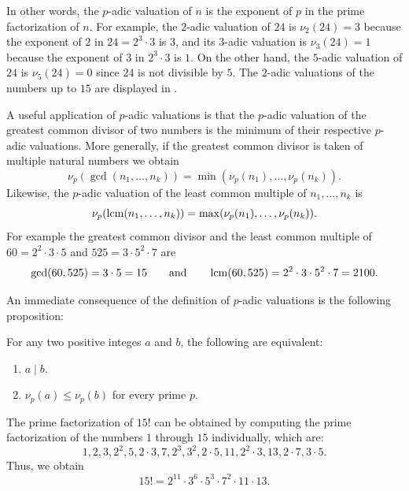 In other words, the $p$-adic valuation of $n$ is the exponent of $p$ in the prime factorization of $n$. For example, the $2$-adic valuation of $24$ is $\nu_2(24)=3$ because the exponent of $2$ in $24=2^3\cdot 3$ is $3$, and its $3$-adic valuation is $\nu_3(24)=1$ because the exponent of $3$ in $2^3\cdot 3$ is $1$. On the other hand, the $5$-adic valuation of $24$ is $\nu_5(24)=0$ since $24$ is not divisible by $5$. The $2$-adic valuations of the numbers up to $15$ are displayed in .

\begin{example}
  A useful application of $p$-adic valuations is that the $p$-adic valuation of the greatest common divisor of two numbers is the minimum of their respective $p$-adic valuations. More generally, if the greatest common divisor is taken of multiple natural numbers we obtain
  \begin{equation*}
    \nu_p(\gcd(n_1,\ldots,n_k))=\min(\nu_p(n_1),\ldots,\nu_p(n_k)).
  \end{equation*}
  Likewise, the $p$-adic valuation of the least common multiple of $n_1,\ldots,n_k$ is
  \begin{equation*}
    \nu_p(\operatorname*{lcm}(n_1,\ldots,n_k))=\max(\nu_p(n_1),\ldots,\nu_p(n_k)).
  \end{equation*}
  For example the greatest common divisor and the least common multiple of $60=2^2\cdot 3\cdot 5$ and $525=3\cdot 5^2\cdot 7$ are
  \begin{equation*}
    \gcd(60,525)=3\cdot 5=15\qquad\text{and}\qquad\operatorname*{lcm}(60,525)=2^2\cdot 3\cdot 5^2\cdot 7=2100.
  \end{equation*}  
\end{example}

An immediate consequence of the definition of $p$-adic valuations is the following proposition:

\begin{proposition}
  For any two positive integes $a$ and $b$, the following are equivalent:
  \begin{enumerate}
  \item $a\mid b$.
  \item $\nu_p(a)\leq\nu_p(b)$ for every prime $p$.
  \end{enumerate}
\end{proposition}

\begin{example}\label{example:15!}
  The prime factorization of $15!$ can be obtained by computing the prime factorization of the numbers $1$ through $15$ individually, which are:
  \begin{equation*}
    1,2,3,2^2,5,2\cdot 3,7,2^3,3^2,2\cdot 5,11,2^2\cdot 3,13,2\cdot 7,3\cdot 5.
  \end{equation*}
  Thus, we obtain
  \begin{equation*}
    15!=2^{11}\cdot 3^6\cdot 5^3\cdot 7^2 \cdot 11\cdot 13.
  \end{equation*}
\end{example}


